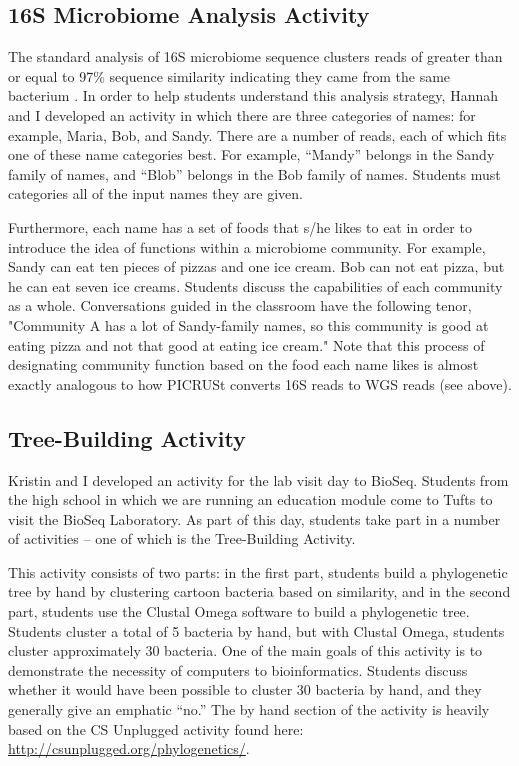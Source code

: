 \documentclass{report}
\begin{document}
\subsection{16S Microbiome Analysis Activity}
The standard analysis of 16S microbiome sequence clusters reads of greater than or equal to 97\% sequence similarity indicating they came from the same bacterium \cite{glockner2000comparative}. In order to help students understand this analysis strategy, Hannah and I developed an activity in which there are three categories of names: for example, Maria, Bob, and Sandy. There are a number of reads, each of which fits one of these name categories best. For example, ``Mandy'' belongs in the Sandy family of names, and ``Blob'' belongs in the Bob family of names. Students must categories all of the input names they are given.

Furthermore, each name has a set of foods that s/he likes to eat in order to introduce the idea of functions within a microbiome community. For example, Sandy can eat ten pieces of pizzas and one ice cream. Bob can not eat pizza, but he can eat seven ice creams. Students discuss the capabilities of each community as a whole. Conversations guided in the classroom have the following tenor, "Community A has a lot of Sandy-family names, so this community is good at eating pizza and not that good at eating ice cream." Note that this process of designating community function based on the food each name likes is almost exactly analogous to how PICRUSt converts 16S reads to WGS reads (see above).

\subsection{Tree-Building Activity}
Kristin and I developed an activity for the lab visit day to BioSeq. Students from the high school in which we are running an education module come to Tufts to visit the BioSeq Laboratory. As part of this day, students take part in a number of activities -- one of which is the Tree-Building Activity.

This activity consists of two parts: in the first part, students build a phylogenetic tree by hand by clustering cartoon bacteria based on similarity, and in the second part, students use the Clustal Omega software to build a phylogenetic tree. Students cluster a total of 5 bacteria by hand, but with Clustal Omega, students cluster approximately 30 bacteria. One of the main goals of this activity is to demonstrate the necessity of computers to bioinformatics. Students discuss whether it would have been possible to cluster 30 bacteria by hand, and they generally give an emphatic ``no.'' The by hand section of the activity is heavily based on the CS Unplugged activity found here: \url{http://csunplugged.org/phylogenetics/}.
\end{document}
